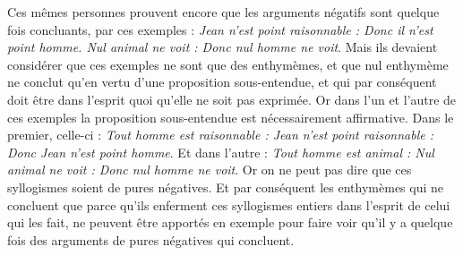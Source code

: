 Ces mêmes personnes prouvent encore que les arguments négatifs sont quelque fois concluants, par ces exemples : \emph{Jean n'est point raisonnable : Donc il n'est point homme. Nul animal ne voit : Donc nul homme ne voit}. Mais ils devaient considérer que ces exemples ne sont que des enthymèmes, et que nul enthymème ne conclut qu'en vertu d'une proposition sous-entendue, et qui par conséquent doit être dans l'esprit quoi qu'elle ne soit pas exprimée. Or dans l'un et l'autre de ces exemples la proposition sous-entendue est nécessairement affirmative. Dans le premier, celle-ci : \emph{Tout homme est raisonnable : Jean n'est point raisonnable : Donc Jean n'est point homme}. Et dans l'autre : \emph{Tout homme est animal : Nul animal ne voit : Donc nul homme ne voit}. Or on ne peut pas dire que ces syllogismes soient de pures négatives. Et par conséquent les enthymèmes qui ne concluent que parce qu'ils enferment ces syllogismes entiers dans l'esprit de celui qui les fait, ne peuvent être apportés en exemple pour faire voir qu'il y a quelque fois des arguments de pures négatives qui concluent.


